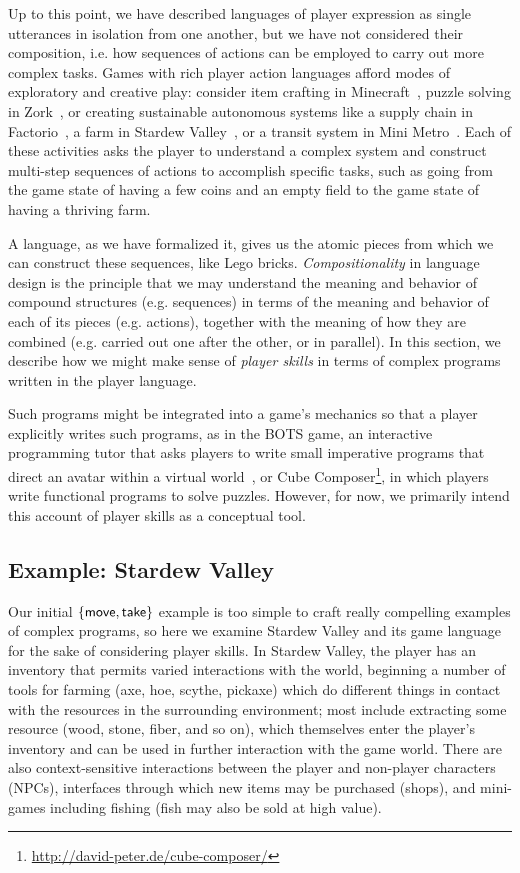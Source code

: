 Up to this point, we have described languages of player expression as
single utterances in isolation from one another, but we have not considered
their composition, i.e. how sequences of actions can be employed to carry out
more complex tasks. Games with rich player action languages afford modes of
exploratory and creative play: consider item crafting in
Minecraft~\cite{minecraft}, puzzle solving in Zork~\cite{blank1980zork}, or
creating sustainable autonomous systems like a supply chain in
Factorio~\cite{factorio}, a farm in Stardew Valley~\cite{stardew}, or a
transit system in Mini Metro~\cite{minimetro}.  Each of these activities
asks the player to understand a complex system and construct multi-step
sequences of actions to accomplish specific tasks, such as going from the
game state of having a few coins and an empty field to the game state of
having a thriving farm.

A language, as we have formalized it, gives us the atomic pieces from which
we can construct these sequences, like Lego bricks. {\em Compositionality}
in language design is the principle that we may understand the meaning and
behavior of compound structures (e.g. sequences) in terms of the meaning
and behavior of each of its pieces (e.g. actions), together with the
meaning of how they are combined (e.g. carried out one after the other, or
in parallel). In this section, we describe how we might make sense of {\em
player skills} in terms of complex programs written in the player language.

Such programs might be integrated into a game's mechanics so that a player
explicitly writes such programs, as in the BOTS game, an interactive
programming tutor that asks players to write small imperative programs that
direct an avatar within a virtual world~\cite{hicks2012creation}, or Cube
Composer\footnote{\url{http://david-peter.de/cube-composer/}}, in which
players write functional programs to solve puzzles. However, for now, we
primarily intend this account of player skills as a conceptual tool.

\subsection{Example: Stardew Valley}

Our initial $\{\mathsf{move}, \mathsf{take}\}$ example is too simple to craft really
compelling examples of complex programs, so here we examine
Stardew Valley and its game language for the sake of considering player
skills. In Stardew Valley, the player has an inventory that permits varied
interactions with the world, beginning a number of tools for farming (axe,
hoe, scythe, pickaxe) which do different things in contact with the
resources in the surrounding environment; most include extracting some
resource (wood, stone, fiber, and so on), which themselves enter the
player's inventory and can be used in further interaction with the game
world. There are also context-sensitive interactions between the player and
non-player characters (NPCs), interfaces through which new items may be
purchased (shops), and mini-games including fishing (fish may also be sold
at high value).

